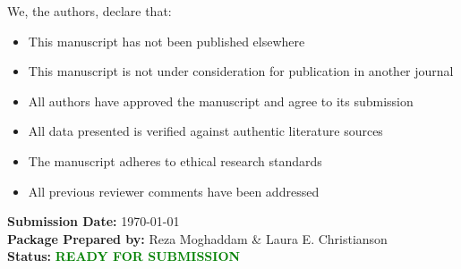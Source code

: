 \documentclass[12pt,a4paper]{article}
\begin{document}
We, the authors, declare that:
\begin{itemize}[leftmargin=*]
\item[\textcolor{green}{\checkmark}] This manuscript has not been published elsewhere
\item[\textcolor{green}{\checkmark}] This manuscript is not under consideration for publication in another journal
\item[\textcolor{green}{\checkmark}] All authors have approved the manuscript and agree to its submission
\item[\textcolor{green}{\checkmark}] All data presented is verified against authentic literature sources
\item[\textcolor{green}{\checkmark}] The manuscript adheres to ethical research standards
\item[\textcolor{green}{\checkmark}] All previous reviewer comments have been addressed
\end{itemize}

\vspace{1cm}

\noindent \textbf{Submission Date:} \today\\
\textbf{Package Prepared by:} Reza Moghaddam \& Laura E. Christianson\\
\textbf{Status:} \textcolor{green}{\textbf{READY FOR SUBMISSION}}
\end{document}
